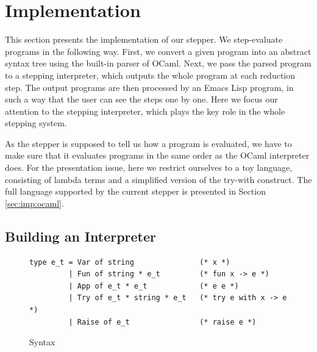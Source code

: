 \section{Implementation}
\label{sec:imp}

This section presents the implementation of our stepper.  We step-evaluate programs in the following way.
First, we convert a given program into an abstract syntax tree using the built-in parser of OCaml.
Next, we pass the parsed program to a stepping interpreter,
which outputs the whole program at each reduction step.
The output programs are then processed by an Emacs Lisp program,
in such a way that the user can see the steps one by one.  Here we focus our attention to the stepping interpreter,
which plays the key role in the whole stepping system.

As the stepper is supposed to tell us how a program is evaluated, we have to make sure that it evaluates programs in the same order as the OCaml interpreter does.
For the presentation issue, here we restrict ourselves to a toy language,
consisting of lambda terms and a simplified version of the try-with construct.
The full language supported by the current stepper is presented in Section \ref{sec:imp:ocaml}.  

\subsection{Building an Interpreter}
\label{sec:imp:interpreter}

\begin{figure}
\begin{verbatim}
type e_t = Var of string               (* x *)
         | Fun of string * e_t         (* fun x -> e *)
         | App of e_t * e_t            (* e e *)
         | Try of e_t * string * e_t   (* try e with x -> e *)
         | Raise of e_t                (* raise e *)
\end{verbatim}
\caption{Syntax}
\label{figure:typee}
\end{figure}

